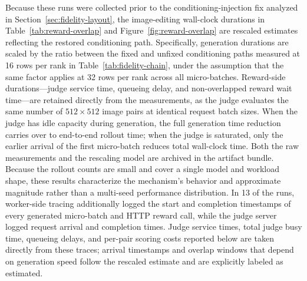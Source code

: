Because these runs were collected prior to the conditioning-injection fix analyzed in Section~\ref{sec:fidelity-layout}, the image-editing wall-clock durations in Table~\ref{tab:reward-overlap} and Figure~\ref{fig:reward-overlap} are rescaled estimates reflecting the restored conditioning path.
Specifically, generation durations are scaled by the ratio between the fixed and unfixed conditioning paths measured at 16 rows per rank in Table~\ref{tab:fidelity-chain}, under the assumption that the same factor applies at 32 rows per rank across all micro-batches.
Reward-side durations---judge service time, queueing delay, and non-overlapped reward wait time---are retained directly from the measurements, as the judge evaluates the same number of $512\times512$ image pairs at identical request batch sizes.
When the judge has idle capacity during generation, the full generation time reduction carries over to end-to-end rollout time; when the judge is saturated, only the earlier arrival of the first micro-batch reduces total wall-clock time.
Both the raw measurements and the rescaling model are archived in the artifact bundle.
Because the rollout counts are small and cover a single model and workload shape, these results characterize the mechanism's behavior and approximate magnitude rather than a multi-seed performance distribution.
In 13 of the runs, worker-side tracing additionally logged the start and completion timestamps of every generated micro-batch and HTTP reward call, while the judge server logged request arrival and completion times.
Judge service times, total judge busy time, queueing delays, and per-pair scoring costs reported below are taken directly from these traces; arrival timestamps and overlap windows that depend on generation speed follow the rescaled estimate and are explicitly labeled as estimated.

\begin{table}[H]
\caption{Generation plus reward wall-clock time per rollout across three scheduling modes (mean and min--max range over steady-state rollouts). Image-editing rows pair BAGEL with a remote EditScore judge; the bottom block pairs BAGEL text-to-image generation with an in-process PickScore backend. Overlapped rows pool the merged implementation (which queues all completed micro-batches) with an earlier prototype (which kept at most one request in flight); the artifact bundle reports both separately. $^{\dagger}$Estimated for the restored conditioning path of Section~\ref{sec:fidelity-layout} from measured reward-side traces; rollout counts reflect the underlying traced runs.}
\label{tab:reward-overlap}
\centering
\small

\end{table}

